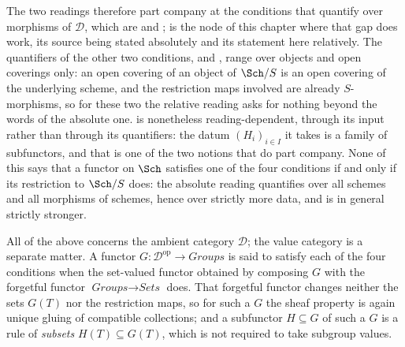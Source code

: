 \begin{definition}
The two readings therefore part company at the conditions that quantify over
morphisms of $\mathcal D$, which are  and
;  is the node of
this chapter where that gap does work, its source being stated absolutely and
its statement here relatively.  The quantifiers of the other two conditions,
 and , range over
objects and open coverings only: an open covering of an object of $\Sch/S$ is
an open covering of the underlying scheme, and the restriction maps involved
are already $S$-morphisms, so for these two the relative reading asks for
nothing beyond the words of the absolute one.   is
nonetheless reading-dependent, through its input rather than through its
quantifiers: the datum $(H_i)_{i\in I}$ it takes is a family of subfunctors,
and that is one of the two notions that do part company.  None of this says
that a functor on $\Sch$ satisfies one of the four conditions if and only if
its restriction to $\Sch/S$ does: the absolute reading quantifies over all
schemes and all morphisms of schemes, hence over strictly more data, and is
in general strictly stronger.

All of the above concerns the ambient category $\mathcal D$; the value
category is a separate matter.  A functor
$G:\mathcal D^{\mathrm{op}}\to\textit{Groups}$ is said to satisfy each of the
four conditions when the set-valued functor obtained by composing $G$ with
the forgetful functor $\textit{Groups}\to\textit{Sets}$ does.  That forgetful
functor changes neither the sets $G(T)$ nor the restriction maps, so for such
a $G$ the sheaf property is again unique gluing of compatible collections;
and a subfunctor $H\subseteq G$ of such a $G$ is a rule of \emph{subsets}
$H(T)\subseteq G(T)$, which is not required to take subgroup values.
\end{definition}
